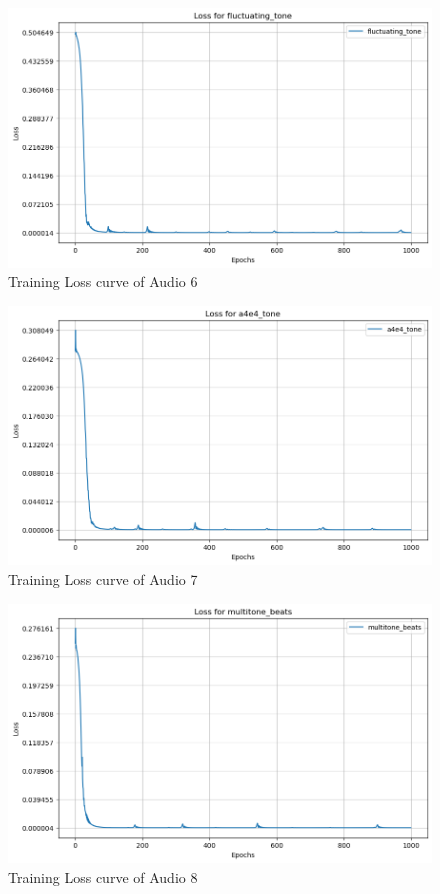 \documentclass{ioereport}
\begin{document}
    \begin{figure}[H]
        \centering
        \includegraphics[width=\linewidth]{assets/audio_loss_curves/fluctuating_tone400.png}
        \caption{Training Loss curve of Audio 6}
        \label{fig:loss-curve-6}
    \end{figure}
    \begin{figure}[H]
        \centering
        \includegraphics[width=\linewidth]{assets/audio_loss_curves/multitone_a4e4.png}
        \caption{Training Loss curve of Audio 7}
        \label{fig:loss-curve-7}
    \end{figure}
    \begin{figure}[H]
        \centering
        \includegraphics[width=\linewidth]{assets/audio_loss_curves/multitone_beats.png}
        \caption{Training Loss curve of Audio 8}
        \label{fig:loss-curve-8}
    \end{figure}
\end{document}
